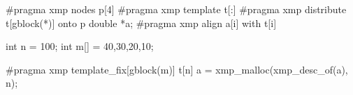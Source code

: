 \begin{XCexample}
#pragma xmp nodes p[4]
#pragma xmp template t[:]
#pragma xmp distribute t[gblock(*)] onto p
double *a;
#pragma xmp align a[i] with t[i]

int n = 100;
int m[] = {40,30,20,10};

#pragma xmp template_fix[gblock(m)] t[n]
a = xmp_malloc(xmp_desc_of(a), n);
\end{XCexample}

